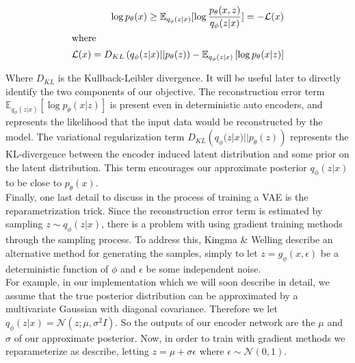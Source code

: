 \documentclass{article} %
\renewcommand{\L}{\mathcal{L}}
\begin{document}
\begin{align}
\log p_\theta(x)\geq \mathbb{E}_{q_\phi(z|x)}[\log\frac{p_\theta(x,z)}{q_\phi(z|x)}]=-\L(x)\\
\intertext{where}
  \L(x)=D_{KL}\left(q_\phi(z|x)||p_\theta(z)\right)-\mathbb{E}_{q_\phi(z|x)}\left[\log{p_\theta(x|z)}\right]
  \label{eq:VAEOBJECTIVE}
\end{align}
 
 Where $D_{KL}$ is the Kullback-Leibler divergence. It will be useful later to directly identify the two components of our objective. The reconstruction error term $\mathbb{E}_{q_\phi(z|x)}\left[\log{p_\theta(x|z)}\right]$ is present even in deterministic auto encoders, and represents the likelihood that the input data would be reconstructed by the model. The variational regularization term $D_{KL}\left(q_\phi(z|x)||p_\theta(z)\right)$ represents the KL-divergence between the encoder induced latent distribution and some prior on the latent distribution. This term encourages our approximate posterior $q_\phi(z|x)$ to be close to $p_\theta(x)$.\\ 
 Finally, one last detail to discuss in the process of training a VAE is the reparametrization trick. Since the reconstruction error term is estimated by sampling $z\sim q_\phi(z|x)$, there is a problem with using gradient training methods through the sampling process. To address this, Kingma \& Welling describe an alternative method for generating the samples, simply to let $z=g_\phi(x,\epsilon)$ be a deterministic function of $\phi$ and $\epsilon$ be some independent noise. \\
 For example, in our implementation which we will soon describe in detail, we assume that the true posterior distribution can be approximated by a multivariate Gaussian with diagonal covariance. Therefore we let $q_\phi(z|x)=\mathcal{N}(z;\mu,\sigma^2 I)$. So the outputs of our encoder network are the $\mu$ and $\sigma$ of our approximate posterior. Now, in order to train with gradient methods we reparameterize as describe, letting $z=\mu + \sigma\epsilon$ where $\epsilon \sim \mathcal{N}(0,1)$.\\
 


\end{document}
